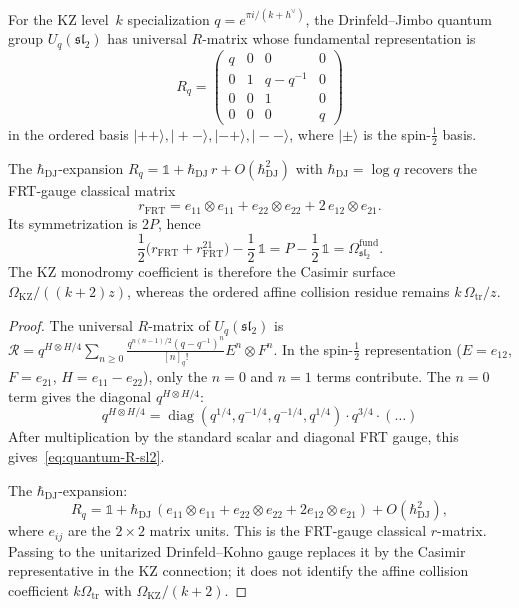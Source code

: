 \begin{theorem}
\label{thm:quantum-rmatrix-shadow}
For the KZ level~$k$ specialization
\(q = e^{\pi i/(k+h^\vee)}\), the Drinfeld--Jimbo quantum group
$U_q(\mathfrak{sl}_2)$ has universal $R$-matrix whose
fundamental representation is
\begin{equation}\label{eq:quantum-R-sl2}
R_q =
\begin{pmatrix}
q & 0 & 0 & 0 \\
0 & 1 & q - q^{-1} & 0 \\
0 & 0 & 1 & 0 \\
0 & 0 & 0 & q
\end{pmatrix}
\end{equation}
in the ordered basis $|{+}{+}\rangle, |{+}{-}\rangle,
|{-}{+}\rangle, |{-}{-}\rangle$, where $|{\pm}\rangle$ is
the spin-$\frac{1}{2}$ basis.

The $\hbar_{\mathrm{DJ}}$-expansion
$R_q = \mathbb{1} + \hbar_{\mathrm{DJ}}\, r + O(\hbar_{\mathrm{DJ}}^2)$
with $\hbar_{\mathrm{DJ}} = \log q$ recovers the FRT-gauge classical matrix
\[
r_{\mathrm{FRT}}
= e_{11}\otimes e_{11}+e_{22}\otimes e_{22}
  +2\,e_{12}\otimes e_{21}.
\]
Its symmetrization is \(2P\), hence
\[
\frac12\bigl(r_{\mathrm{FRT}}+r_{\mathrm{FRT}}^{21}\bigr)
-\frac12\,\mathbb{1}
=P-\frac12\,\mathbb{1}
=\Omega_{\mathfrak{sl}_2}^{\mathrm{fund}}.
\]
The KZ monodromy coefficient is therefore the Casimir surface
\(\Omega_{\mathrm{KZ}}/((k+2)z)\), whereas the ordered affine
collision residue remains \(k\,\Omega_{\mathrm{tr}}/z\).
\end{theorem}

\begin{proof}
The universal $R$-matrix of $U_q(\mathfrak{sl}_2)$ is
$\mathcal{R} = q^{H \otimes H/4}
\sum_{n \geq 0} \frac{q^{n(n-1)/2}(q - q^{-1})^n}{[n]_q!}
E^n \otimes F^n$.
In the spin-$\frac{1}{2}$ representation ($E = e_{12}$,
$F = e_{21}$, $H = e_{11} - e_{22}$), only the $n = 0$ and
$n = 1$ terms contribute. The $n = 0$ term gives the diagonal
$q^{H \otimes H/4}$:
\[
q^{H \otimes H / 4}
= \operatorname{diag}(q^{1/4}, q^{-1/4}, q^{-1/4}, q^{1/4})
\cdot q^{3/4} \cdot (\ldots)
\]
After multiplication by the standard scalar and diagonal FRT gauge,
this gives~\eqref{eq:quantum-R-sl2}.

The $\hbar_{\mathrm{DJ}}$-expansion:
\[
R_q=\mathbb{1}
+\hbar_{\mathrm{DJ}}\,(e_{11}\otimes e_{11}+e_{22}\otimes e_{22}
       +2e_{12}\otimes e_{21})
+O(\hbar_{\mathrm{DJ}}^2),
\]
where \(e_{ij}\) are the \(2\times2\) matrix units. This is the
FRT-gauge classical \(r\)-matrix. Passing to the unitarized
Drinfeld--Kohno gauge replaces it by the Casimir representative in
the KZ connection; it does not identify the affine collision
coefficient \(k\Omega_{\mathrm{tr}}\) with
\(\Omega_{\mathrm{KZ}}/(k+2)\).
\end{proof}

